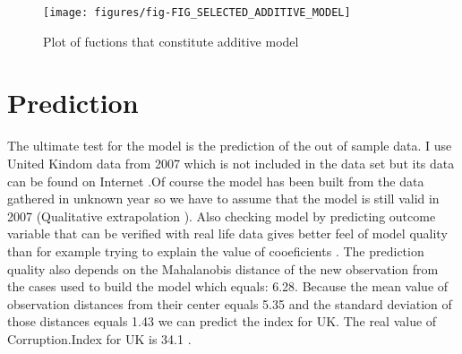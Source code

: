 \documentclass[a4paper]{article}
\begin{document}
\begin{figure}[H]
\begin{center}
\texttt{[image: figures/fig-FIG\_SELECTED\_ADDITIVE\_MODEL]}
\caption{Plot of fuctions that constitute additive model}
\end{center}
\end{figure}

\section{Prediction}
The ultimate test for the model is the prediction of the out of sample data. I
use United Kindom data from 2007 which is not included in the data set but its
data can be found on Internet \cite{worldbankData}.Of course the model has been
built from the data gathered in unknown year so we have to assume that the model
is still valid in 2007 (Qualitative extrapolation \cite{Faraway}). Also checking
model by predicting outcome variable that can be verified with real life data
gives better feel of model quality than for example trying to explain the value
of cooeficients \cite{Faraway}. 
The prediction quality also depends on the
Mahalanobis distance of the new observation from the cases used to build the
model which equals: 6.28. Because
the mean value of observation distances from their center equals
5.35 and the standard
deviation of those distances equals
1.43 we can predict the index for UK.
The real value of Corruption.Index for UK is
34.1 \cite{failedIndex2007}.
\end{document}
